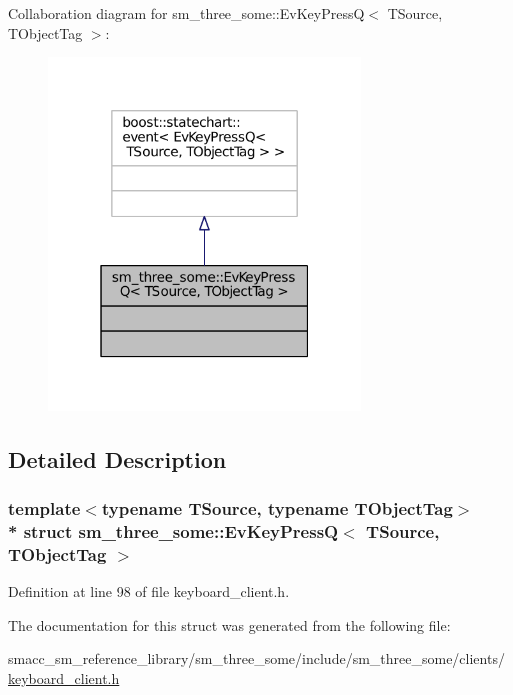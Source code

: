 Collaboration diagram for sm\+\_\+three\+\_\+some\+:\+:Ev\+Key\+PressQ$<$ T\+Source, T\+Object\+Tag $>$\+:
\nopagebreak
\begin{figure}[H]
\begin{center}
\leavevmode
\includegraphics[width=235pt]{structsm__three__some_1_1EvKeyPressQ__coll__graph}
\end{center}
\end{figure}


\subsection{Detailed Description}
\subsubsection*{template$<$typename T\+Source, typename T\+Object\+Tag$>$\\*
struct sm\+\_\+three\+\_\+some\+::\+Ev\+Key\+Press\+Q$<$ T\+Source, T\+Object\+Tag $>$}



Definition at line 98 of file keyboard\+\_\+client.\+h.



The documentation for this struct was generated from the following file\+:\begin{DoxyCompactItemize}
\item 
smacc\+\_\+sm\+\_\+reference\+\_\+library/sm\+\_\+three\+\_\+some/include/sm\+\_\+three\+\_\+some/clients/\hyperlink{keyboard__client_8h}{keyboard\+\_\+client.\+h}\end{DoxyCompactItemize}
